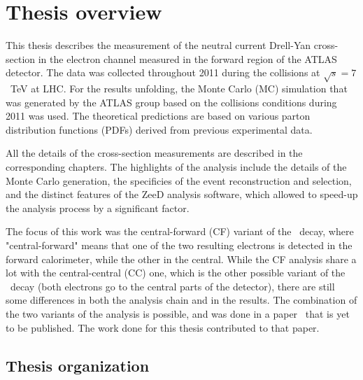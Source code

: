 \chapter{Thesis overview}
\label{sec:TOverview}

This thesis describes the measurement of the neutral current Drell-Yan cross-section in the electron channel measured in the forward region of the ATLAS detector. The data was collected throughout 2011 during the collisions at $\sqrt{s} = 7$~TeV at LHC. For the results unfolding, the Monte Carlo (MC) simulation that was generated by the ATLAS group based on the collisions conditions during 2011 was used. The theoretical predictions are based on various parton distribution functions (PDFs) derived from previous experimental data.

All the details of the cross-section measurements are described in the corresponding chapters. The highlights of the analysis include the details of the Monte Carlo generation, the specificies of the event reconstruction and selection, and the distinct features of the ZeeD analysis software, which allowed to speed-up the analysis process by a significant factor.

The focus of this work was the central-forward (CF) variant of the \Zee\ decay, where "central-forward" means that one of the two resulting electrons is detected in the forward calorimeter, while the other in the central. While the CF analysis share a lot with the central-central (CC) one, which is the other possible variant of the \Zee\ decay (both electrons go to the central parts of the detector), there are still some differences in both the analysis chain and in the results. The combination of the two variants of the analysis is possible, and was done in a paper~\cite{lib:wz2011} that is yet to be published. The work done for this thesis contributed to that paper.


\section{Thesis organization}
\label{sec:TOrganization}

